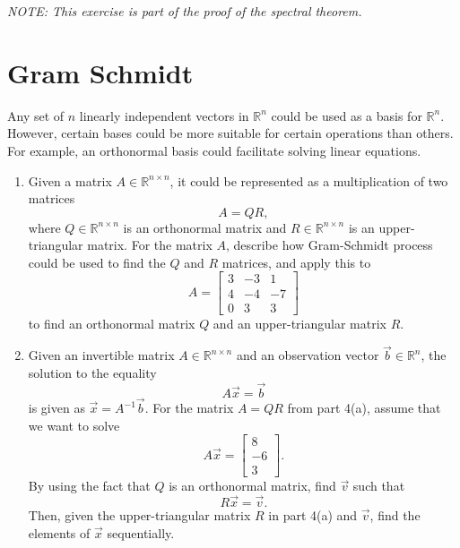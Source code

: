 \documentclass[10pt]{article}
\theoremstyle{definition}
\theoremstyle{plain}
\newcommand{\RR}{\mathbb{R}}
\newcommand{\vv}[1]{\vec{#1}}
\begin{document}
\textit{NOTE: This exercise is part of the proof of the spectral theorem.}

\section{Gram Schmidt}

Any set of $n$ linearly independent vectors in $\RR^n$ could be used as a basis for $\RR^n$. However, certain bases could be more suitable for certain operations than others. For example, an orthonormal basis could facilitate solving linear equations.

\begin{enumerate}[label=(\alph*)]
\item Given a matrix $A \in \RR^{n \times n}$, it could be represented as a multiplication of two matrices
\begin{equation}
A = QR,
\end{equation}
where $Q \in \RR^{n \times n}$ is an orthonormal matrix and $R \in \RR^{n \times n}$ is an upper-triangular matrix. For the matrix $A$, describe how Gram-Schmidt process could be used to find the $Q$ and $R$ matrices, and apply this to
\begin{equation}
A = \begin{bmatrix} 3 & -3 & 1 \\ 4 & -4 & -7 \\ 0 & 3 & 3 \end{bmatrix}
\end{equation}
to find an orthonormal matrix $Q$ and an upper-triangular matrix $R$.

\item Given an invertible matrix $A \in \RR^{n \times n}$ and an observation vector $\vv{b} \in \RR^n$, the solution to the equality
\begin{equation}
A\vv{x} = \vv{b}
\end{equation}
is given as $\vv{x} = A^{-1}\vv{b}$. For the matrix $A = QR$ from part 4(a), assume that we want to solve
\begin{equation}
A\vv{x} = \begin{bmatrix} 8 \\ -6 \\ 3 \end{bmatrix}.
\end{equation}
By using the fact that $Q$ is an orthonormal matrix, find $\vv{v}$ such that
\begin{equation}
R\vv{x} = \vv{v}.
\end{equation}
Then, given the upper-triangular matrix $R$ in part 4(a) and $\vv{v}$, find the elements of $\vv{x}$ sequentially.


\end{enumerate}
\end{document}
